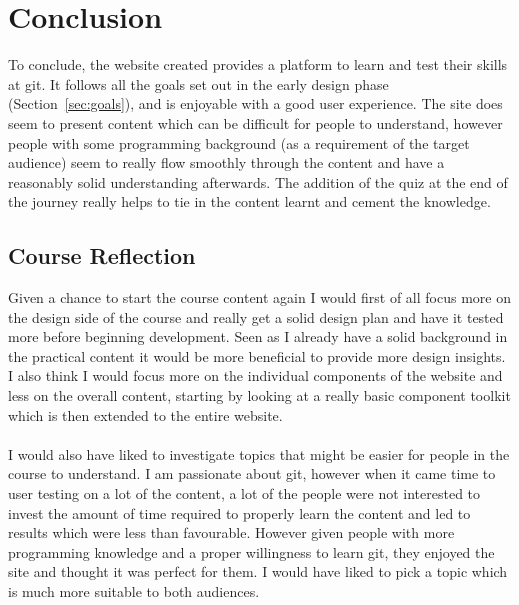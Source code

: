 
\chapter{Conclusion}
To conclude, the website created provides a platform to learn and test their skills at \gls{git}. It follows all the goals set out in the early design phase (Section~\ref{sec:goals}), and is enjoyable with a good user experience. The site does seem to present content which can be difficult for people to understand, however people with some programming background (as a requirement of the target audience) seem to really flow smoothly through the content and have a reasonably solid understanding afterwards. The addition of the quiz at the end of the journey really helps to tie in the content learnt and cement the knowledge.

\section{Course Reflection}
Given a chance to start the course content again I would first of all focus more on the design side of the course and really get a solid design plan and have it tested more before beginning development. Seen as I already have a solid background in the practical content it would be more beneficial to provide more design insights. I also think I would focus more on the individual components of the website and less on the overall content, starting by looking at a really basic component toolkit which is then extended to the entire website.\\\\
I would also have liked to investigate topics that might be easier for people in the course to understand. I am passionate about \gls{git}, however when it came time to user testing on a lot of the content, a lot of the people were not interested to invest the amount of time required to properly learn the content and led to results which were less than favourable. However given people with more programming knowledge and a proper willingness to learn \gls{git}, they enjoyed the site and thought it was perfect for them. I would have liked to pick a topic which is much more suitable to both audiences.